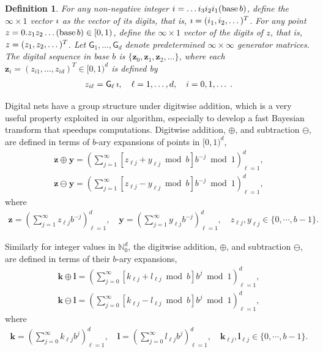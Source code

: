 \documentclass[graybox,footinfo]{svmult}
\let\vec\relax
\newtheorem{defn}{Definition}
\newcommand{\bm}[1]{\boldsymbol{#1}}
\newcommand{\naturals}{\mathbb{N}}
\newcommand{\vk}{\bm{k}}
\newcommand{\vl}{\bm{l}}
\newcommand{\vy}{\bm{y}}
\newcommand{\vz}{\bm{z}}
\begin{document}
\begin{defn}
	For any non-negative integer $i = \dots i_3 i_2 i_1(\textup{base} \, b)$, define the $\infty \times 1$ vector $\vec{\imath}$ as the vector of its digits, that is, $ \vec{\imath} = (i_1, i_2, \dots)^T$. 
	For any point $z = 0.z_1 z_2 \dots (\textup{base}\, b) \in [0, 1)$, define the $\infty \times 1$ vector of the digits of $z$, that is, $\vec{z} = (z_1, z_2, \dots)^T$. 
	Let $ \mathsf{G}_1, \dots , \mathsf{G}_d$ denote predetermined $\infty \times \infty$ generator matrices. 
	The digital sequence in \textup{base} $b$ is $\{\vz_0, \vz_1, \vz_2, \dots\}$, where each $\vz_i = ( z_{i1}, \dots , z_{id})^T \in [0, 1)^d$ is defined by
	\begin{align*}
	\vec{z}_{i\ell} = \mathsf{G}_{\ell} \, \vec{\imath}, \quad \ell = 1, \dots, d, \quad i = 0, 1, \dots \;.
	\end{align*}
\end{defn}



Digital nets have a group structure under digitwise addition, which is a very useful property exploited in our algorithm, especially to develop a fast Bayesian transform that speedups computations.
Digitwise addition, $\oplus$, and subtraction $\ominus$, are defined in terms of $b$-ary expansions of points in $[0, 1)^d$,
\begin{align*}
\vz \oplus \vy = \left( \sum_{j=1}^\infty [z_{\ell j} + y_{\ell j} \bmod b] b^{-j} \bmod 1 \right)_{\ell=1}^d,
\\
\vz \ominus \vy = \left( \sum_{j=1}^\infty [z_{\ell j} - y_{\ell j} \bmod b] b^{-j} \bmod 1 \right)_{\ell=1}^d,
\end{align*}
where
\begin{align*}
\vz = \left( \sum_{j=1}^{\infty} z_{\ell j}b^{-j}\right)_{\ell=1}^d, \quad
\vy = \left( \sum_{j=1}^{\infty} y_{\ell j}b^{-j}\right)_{\ell=1}^d, \quad
z_{\ell j}, y_{\ell j} \in \{0,\cdots,b-1\}.
\end{align*}



Similarly for integer values in $\naturals_0^d$, the digitwise addition, $\oplus$, and subtraction $\ominus$, are defined in terms of their $b$-ary expansions,
\begin{align*}
\vk \oplus \vl = \left( \sum_{j=0}^\infty [k_{\ell j} + l_{\ell j} \bmod b] b^{j} \bmod 1 \right)_{\ell=1}^d,
\\
\vk \ominus \vl = \left( \sum_{j=0}^\infty [k_{\ell j} - l_{\ell j} \bmod b] b^{j} \bmod 1 \right)_{\ell=1}^d,
\end{align*}
where
\begin{align*}
\vk = \left( \sum_{j=0}^{\infty} k_{\ell j}b^{j}\right)_{\ell=1}^d, \quad
\vl = \left( \sum_{j=0}^{\infty} l_{\ell j}b^{j}\right)_{\ell=1}^d, \quad
\vk_{\ell j}, \vl_{\ell j} \in \{0,\cdots,b-1\}.
\end{align*}
\end{document}
